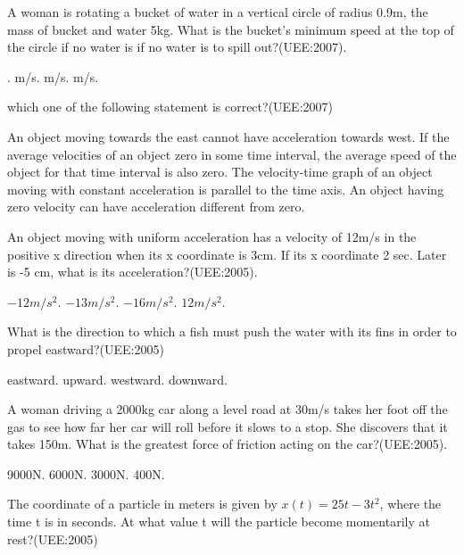 \documentclass[12pt,addpoints]{exam}
\begin{document}
\begin{questions}
	\question A woman is rotating a bucket of water in a vertical circle of radius 0.9m, the mass of bucket and water 5kg. What is the bucket's minimum speed at the top of the circle if no water is if no water is to spill out?(UEE:2007).\\
	\begin{oneparchoices}
		.
		 m/s.
		 m/s.
		 m/s.
	\end{oneparchoices}
	\question which one of the following statement is correct?(UEE:2007)
	\begin{choices}
		\choice An object moving towards the east cannot have acceleration towards west.
		\choice If the average velocities of an object zero in some time interval, the average speed of the object for that time interval is also zero.
		\choice The velocity-time graph of an object moving with constant acceleration is parallel to the time axis.
		\choice An object having zero velocity can have acceleration different from zero.
	\end{choices}
	\question An object moving with uniform acceleration has a velocity of 12m/s in the positive x direction when its x coordinate is 3cm. If its x coordinate 2 sec. Later is -5 cm, what is its acceleration?(UEE:2005). 
	\begin{oneparchoices}
		\choice $-12 m/s^2.$
		\choice $-13 m/s^2.$
		\choice $-16 m/s^2.$
		\choice $12 m/s^2.$
	\end{oneparchoices}
	\question What is the direction to which a fish must push the water  with its fins in order to propel eastward?(UEE:2005)\\
	\begin{oneparchoices}
		\choice eastward.
		\choice upward.
		\choice westward.
		\choice downward.
	\end{oneparchoices}
	\question A woman driving a 2000kg car along a level road at 30m/s takes her foot off the gas to see how far her car will roll before it slows to a stop. She discovers that it takes 150m. What is the greatest force of friction acting on the car?(UEE:2005).\\
	\begin{oneparchoices}
		\choice 9000N.
		\choice 6000N.
		\choice 3000N.
		\choice 400N.
	\end{oneparchoices}
	\question The coordinate of a particle in meters is given by $ x(t)=25t-3t^2$, where the time t is in seconds. At what value t will the particle become momentarily at rest?(UEE:2005)
	\begin{oneparchoices}\\

\end{oneparchoices}
\end{questions}
\end{document}
